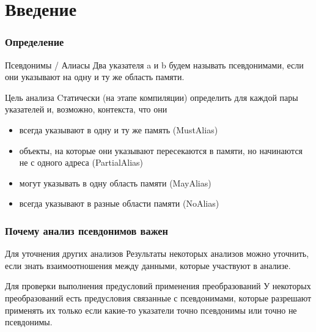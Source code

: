 \documentclass[utf8,russian]{beamer}
\begin{document}
\section{Введение}

\begin{frame}
\frametitle{Определение}

\begin{block}{Псевдонимы / Алиасы}
Два указателя a и b будем называть псевдонимами, если они указывают на одну и ту же область памяти.
\end{block}

\begin{block}{Цель анализа}
Cтатически (на этапе компиляции) определить для каждой пары указателей и, возможно, контекста, что они
\begin{itemize}
\item всегда указывают в одну и ту же память (MustAlias)
\item объекты, на которые они указывают пересекаются в памяти, но начинаются не с одного адреса (PartialAlias)
\item могут указывать в одну область памяти (MayAlias)
\item всегда указывают в разные области памяти (NoAlias)
\end{itemize}
\end{block}

\end{frame}


\begin{frame}
\frametitle{Почему анализ псевдонимов важен}

\begin{block}{Для уточнения других анализов}
Результаты некоторых анализов можно уточнить, если знать взаимоотношения между данными, которые участвуют в анализе.
\end{block}

\begin{block}{Для проверки выполнения предусловий применения преобразований}
У некоторых преобразований есть предусловия связанные с псевдонимами, которые разрешают применять их только если какие-то указатели точно псевдонимы или точно не псевдонимы.
\end{block}

\end{frame}
\end{document}
